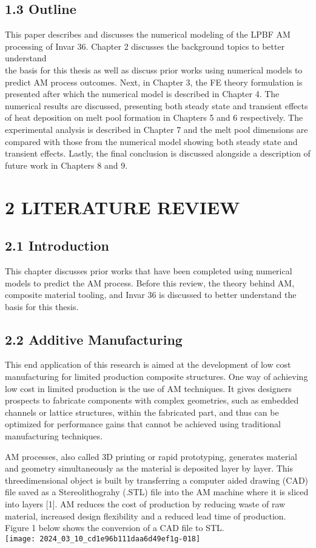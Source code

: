 \documentclass[10pt]{article}
\begin{document}
\subsection*{1.3 Outline}
This paper describes and discusses the numerical modeling of the LPBF AM processing of Invar 36. Chapter 2 discusses the background topics to better understand\\
the basis for this thesis as well as discuss prior works using numerical models to predict AM process outcomes. Next, in Chapter 3, the FE theory formulation is presented after which the numerical model is described in Chapter 4. The numerical results are discussed, presenting both steady state and transient effects of heat deposition on melt pool formation in Chapters 5 and 6 respectively. The experimental analysis is described in Chapter 7 and the melt pool dimensions are compared with those from the numerical model showing both steady state and transient effects. Lastly, the final conclusion is discussed alongside a description of future work in Chapters 8 and 9.

\section*{2 LITERATURE REVIEW}
\subsection*{2.1 Introduction}
This chapter discusses prior works that have been completed using numerical models to predict the AM process. Before this review, the theory behind AM, composite material tooling, and Invar 36 is discussed to better understand the basis for this thesis.

\subsection*{2.2 Additive Manufacturing}
This end application of this research is aimed at the development of low cost manufacturing for limited production composite structures. One way of achieving low cost in limited production is the use of AM techniques. It gives designers prospects to fabricate components with complex geometries, such as embedded channels or lattice structures, within the fabricated part, and thus can be optimized for performance gains that cannot be achieved using traditional manufacturing techniques.

AM processes, also called 3D printing or rapid prototyping, generates material and geometry simultaneously as the material is deposited layer by layer. This threedimensional object is built by transferring a computer aided drawing (CAD) file saved as a Stereolithograhy (.STL) file into the AM machine where it is sliced into layers [1]. AM reduces the cost of production by reducing waste of raw material, increased design flexibility and a reduced lead time of production. Figure 1 below shows the conversion of a CAD file to STL.\\
\texttt{[image: 2024\_03\_10\_cd1e96b111daa6d49ef1g-018]}
\end{document}
